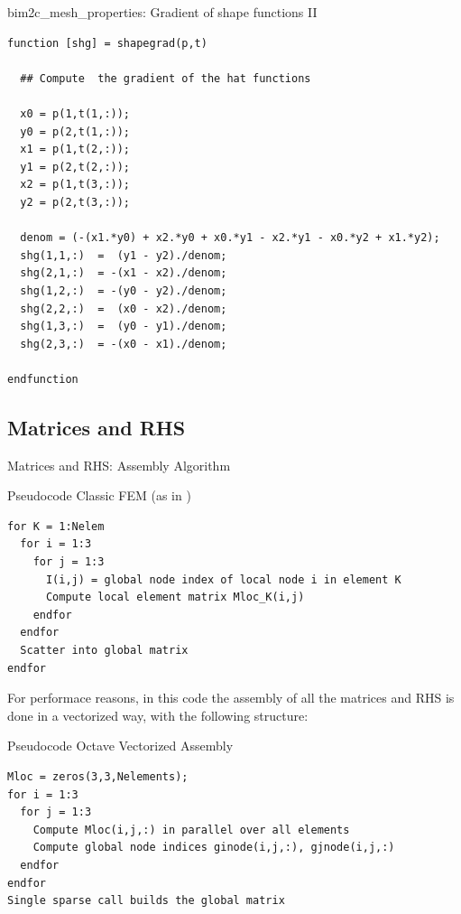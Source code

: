 \documentclass[aspectratio=54,xcolor=dvipsnames]{beamer}
\begin{document}
\begin{frame}[fragile]{bim2c\_mesh\_properties: Gradient of shape functions II}
\scriptsize
\begin{lstlisting}[firstnumber=427]
function [shg] = shapegrad(p,t)
  
  ## Compute  the gradient of the hat functions
  
  x0 = p(1,t(1,:));
  y0 = p(2,t(1,:));
  x1 = p(1,t(2,:));
  y1 = p(2,t(2,:));
  x2 = p(1,t(3,:));
  y2 = p(2,t(3,:));

  denom = (-(x1.*y0) + x2.*y0 + x0.*y1 - x2.*y1 - x0.*y2 + x1.*y2);
  shg(1,1,:)  =  (y1 - y2)./denom;
  shg(2,1,:)  = -(x1 - x2)./denom;
  shg(1,2,:)  = -(y0 - y2)./denom;
  shg(2,2,:)  =  (x0 - x2)./denom;
  shg(1,3,:)  =  (y0 - y1)./denom;
  shg(2,3,:)  = -(x0 - x1)./denom;

endfunction
\end{lstlisting}
\end{frame}

\subsection{Matrices and RHS}
\begin{frame}[fragile]{Matrices and RHS: Assembly Algorithm}
\scriptsize
\begin{block}{Pseudocode Classic FEM (as in \cite{rylander2013})}
\begin{verbatim}
for K = 1:Nelem
  for i = 1:3
    for j = 1:3
      I(i,j) = global node index of local node i in element K
      Compute local element matrix Mloc_K(i,j)
    endfor
  endfor
  Scatter into global matrix
endfor
\end{verbatim}
\end{block}

For performace reasons, in this code the assembly of all the matrices and RHS is done in a vectorized way, with the following structure:
\begin{block}{Pseudocode Octave Vectorized Assembly}
\begin{verbatim}
Mloc = zeros(3,3,Nelements);
for i = 1:3
  for j = 1:3
    Compute Mloc(i,j,:) in parallel over all elements
    Compute global node indices ginode(i,j,:), gjnode(i,j,:) 
  endfor
endfor
Single sparse call builds the global matrix
\end{verbatim}
\end{block}
\end{frame}
\end{document}
